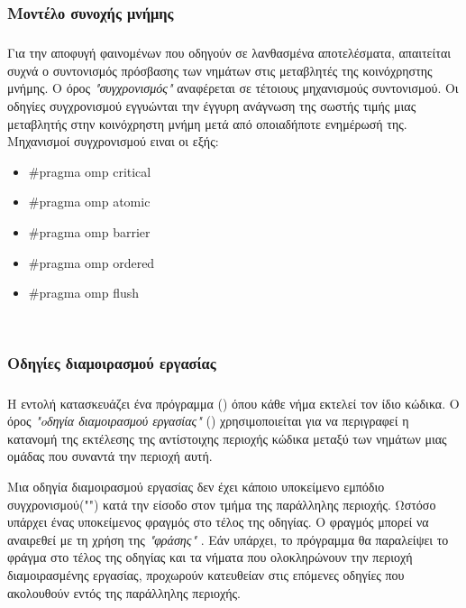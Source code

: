 \subsubsection{Μοντέλο συνοχής μνήμης}
\subparagraph{}
Για την αποφυγή φαινομένων \emph{} που οδηγούν σε λανθασμένα αποτελέσματα, απαιτείται συχνά ο
συντονισμός πρόσβασης των νημάτων στις μεταβλητές της κοινόχρηστης μνήμης. Ο όρος \emph{"συγχρονισμός"} αναφέρεται σε
τέτοιους μηχανισμούς συντονισμού. Οι οδηγίες συγχρονισμού εγγυώνται την έγγυρη ανάγνωση της σωστής τιμής μιας μεταβλητής
στην κοινόχρηστη μνήμη μετά από οποιαδήποτε ενημέρωσή της. Μηχανισμοί συγχρονισμού ειναι οι εξής\cite{book2_23}:
\begin{itemize}
    \item {\#}pragma omp critical 
    \item {\#}pragma omp atomic
    \item {\#}pragma omp barrier 
    \item {\#}pragma omp ordered
    \item {\#}pragma omp flush
\end{itemize}

\ \\
\subsubsection{Οδηγίες διαμοιρασμού εργασίας}
\subparagraph{}
Η εντολή \textbf{} κατασκευάζει ένα \textbf{} πρόγραμμα (\emph{}) όπου κάθε νήμα εκτελεί τον ίδιο κώδικα. Ο όρος \emph{"oδηγία διαμοιρασμού εργασίας"}
(\emph{}) χρησιμοποιείται για να περιγραφεί η κατανομή της εκτέλεσης της αντίστοιχης περιοχής
κώδικα μεταξύ των νημάτων μιας ομάδας που συναντά την περιοχή αυτή.

Μια οδηγία διαμοιρασμού εργασίας δεν έχει κάποιο υποκείμενο εμπόδιο συγχρονισμού("\emph{}") κατά την είσοδο
στον τμήμα της παράλληλης περιοχής. Ωστόσο υπάρχει ένας υποκείμενος φραγμός στο τέλος της οδηγίας. Ο φραγμός μπορεί να
αναιρεθεί με τη χρήση της \emph{"φράσης"}  \textbf{}. Εάν υπάρχει, το πρόγραμμα θα παραλείψει το
φράγμα στο τέλος της οδηγίας και τα νήματα που ολοκληρώνουν την περιοχή διαμοιρασμένης εργασίας, προχωρούν κατευθείαν
στις επόμενες οδηγίες που ακολουθούν εντός της παράλληλης περιοχής\cite{openmpse16}.
\ \\
